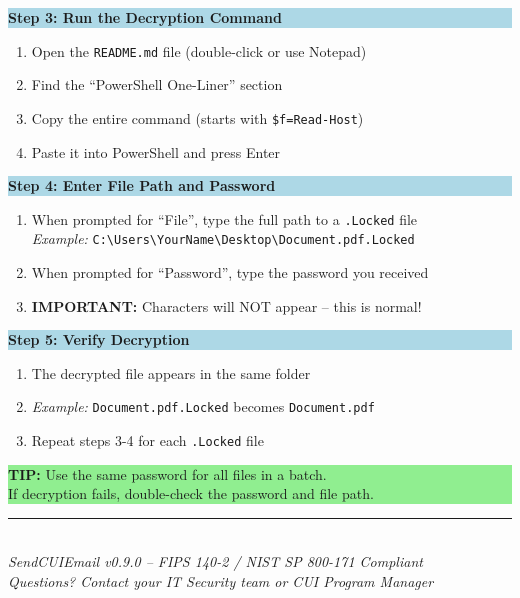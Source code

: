 \documentclass[11pt,letterpaper]{article}
\begin{document}
\colorbox{lightblue}{\parbox{\dimexpr\textwidth-2\fboxsep}{\textbf{Step 3: Run the Decryption Command}}}
\begin{enumerate}[leftmargin=0.4in, topsep=2pt]
    \item Open the \texttt{README.md} file (double-click or use Notepad)
    \item Find the ``PowerShell One-Liner'' section
    \item Copy the entire command (starts with \texttt{\$f=Read-Host})
    \item Paste it into PowerShell and press Enter
\end{enumerate}

\colorbox{lightblue}{\parbox{\dimexpr\textwidth-2\fboxsep}{\textbf{Step 4: Enter File Path and Password}}}
\begin{enumerate}[leftmargin=0.4in, topsep=2pt]
    \item When prompted for ``File'', type the full path to a \texttt{.Locked} file\\
          \textit{Example:} \texttt{C:\textbackslash Users\textbackslash YourName\textbackslash Desktop\textbackslash Document.pdf.Locked}
    \item When prompted for ``Password'', type the password you received
    \item \textbf{IMPORTANT:} Characters will NOT appear -- this is normal!
\end{enumerate}

\colorbox{lightblue}{\parbox{\dimexpr\textwidth-2\fboxsep}{\textbf{Step 5: Verify Decryption}}}
\begin{enumerate}[leftmargin=0.4in, topsep=2pt]
    \item The decrypted file appears in the same folder
    \item \textit{Example:} \texttt{Document.pdf.Locked} becomes \texttt{Document.pdf}
    \item Repeat steps 3-4 for each \texttt{.Locked} file
\end{enumerate}

\vspace{12pt}
\colorbox{lightgreen}{\parbox{\dimexpr\textwidth-2\fboxsep}{
\textbf{TIP:} Use the same password for all files in a batch.\\
If decryption fails, double-check the password and file path.
}}

\vfill

\begin{center}
\rule{0.8\textwidth}{0.4pt}\\[6pt]
\small\textit{SendCUIEmail v0.9.0 -- FIPS 140-2 / NIST SP 800-171 Compliant}\\[3pt]
\small\textit{Questions? Contact your IT Security team or CUI Program Manager}
\end{center}
\end{document}
